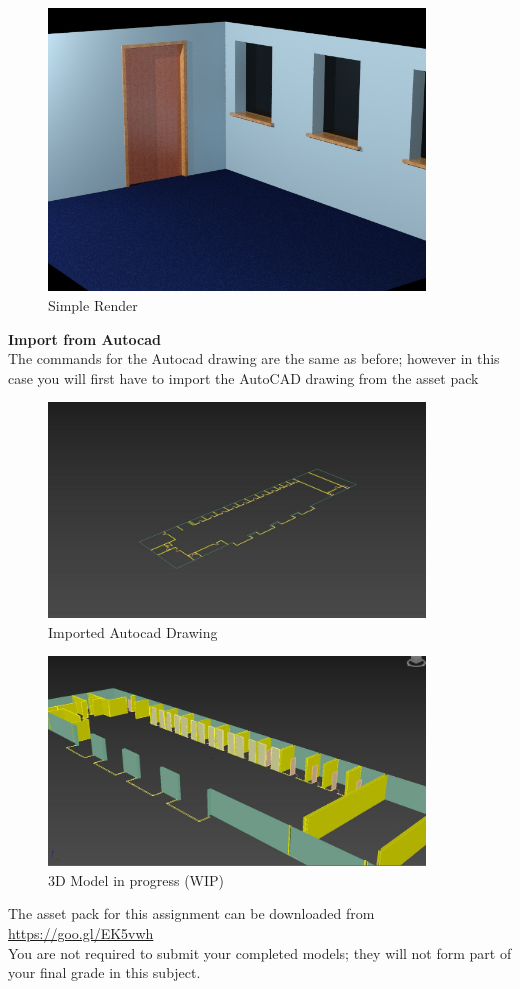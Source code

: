 \vspace{1cm}
\begin{figure}[ht]
	\centering
		\includegraphics[width=10cm]{./img/SimpleRender.jpg}
		\caption{Simple Render}
	\label{fig:Simplerender}
\end{figure}

\newpage

\textbf{Import from Autocad}\\
The commands for the Autocad drawing are the same as before; however in this case you will first have to import the AutoCAD drawing from the asset pack

\begin{figure}[hb]
	\centering
		\includegraphics[width=10cm]{./img/DwgImported.jpg}
		\caption{Imported Autocad Drawing}
	\label{fig:DwgImported}
\end{figure}


\begin{figure}[hb]
	\centering
		\includegraphics[width=10cm]{./img/DwgWIP.jpg}
		\caption{3D Model in progress (WIP)}
	\label{fig:DwgWIP}
\end{figure}





The asset pack for this assignment can be downloaded from \href{https://goo.gl/EK5vwh}{https://goo.gl/EK5vwh}\\

You are not required to submit your completed models; they will not form part of your final grade in this subject.\\

